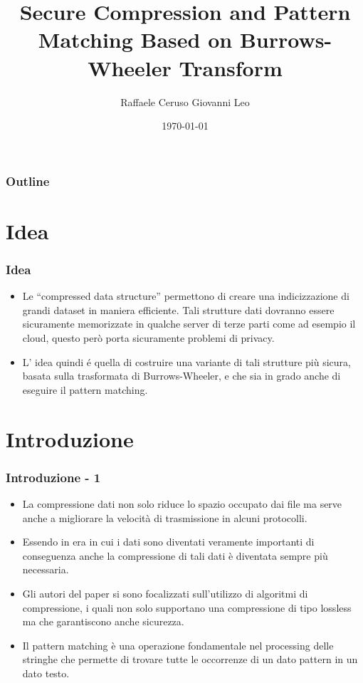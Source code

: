 \documentclass{beamer}
\title[]{Secure Compression and Pattern Matching Based on Burrows-Wheeler Transform}
\institute{Università degli Studi di Salerno}
\author{Raffaele Ceruso Giovanni Leo}
\date{\today}
\begin{document}
\begin{frame}
\titlepage
\end{frame}
\begin{frame}
	\frametitle{Outline}
	\tableofcontents
\end{frame}
\section{Idea}
\begin{frame}
\frametitle{Idea}
	\begin{itemize}
		\item Le ``compressed data structure'' permettono di creare una indicizzazione di grandi dataset in maniera efficiente. Tali strutture dati dovranno essere sicuramente memorizzate in qualche server di terze parti come ad esempio il cloud, questo però porta sicuramente problemi di privacy. \pause
		\item L’ idea quindi é quella di costruire una variante di tali strutture più sicura, basata sulla trasformata di Burrows-Wheeler, e che sia in grado anche di eseguire il pattern matching.
	\end{itemize}
\end{frame}
\section{Introduzione}
\begin{frame}
\frametitle{Introduzione - 1}
	\begin{itemize}
	 \item La compressione dati non solo riduce lo spazio occupato dai file ma serve anche a migliorare la velocità di trasmissione in alcuni protocolli.
	 \pause
	 \item Essendo in era in cui i dati sono diventati veramente importanti di conseguenza anche la compressione di tali dati è diventata sempre più necessaria.
	 \pause
	 \item Gli autori del paper si sono focalizzati sull’utilizzo di algoritmi di compressione, i quali non solo supportano una compressione di tipo lossless ma che garantiscono anche sicurezza.
	 \pause
	 \item Il pattern matching è una operazione fondamentale nel processing delle stringhe che permette di trovare tutte le occorrenze di un dato pattern in un dato testo.
	 \end{itemize}
\end{frame}
\end{document}
